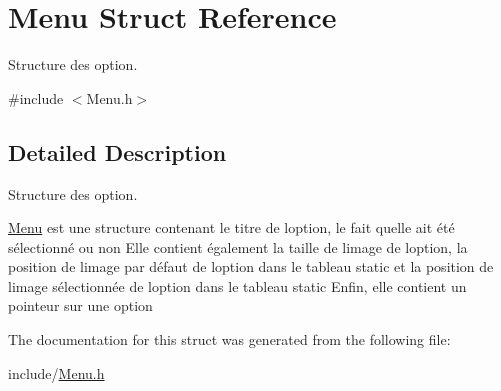 \hypertarget{struct_menu}{}\section{Menu Struct Reference}
\label{struct_menu}


Structure des option.  




{\ttfamily \#include $<$Menu.\+h$>$}



\subsection{Detailed Description}
Structure des option. 

\hyperlink{struct_menu}{Menu} est une structure contenant le titre de l\textquotesingle{}option, le fait qu\textquotesingle{}elle ait été sélectionné ou non Elle contient également la taille de l\textquotesingle{}image de l\textquotesingle{}option, la position de l\textquotesingle{}image par défaut de l\textquotesingle{}option dans le tableau static et la position de l\textquotesingle{}image sélectionnée de l\textquotesingle{}option dans le tableau static Enfin, elle contient un pointeur sur une option 

The documentation for this struct was generated from the following file\+:\begin{DoxyCompactItemize}
\item 
include/\hyperlink{_menu_8h}{Menu.\+h}\end{DoxyCompactItemize}
